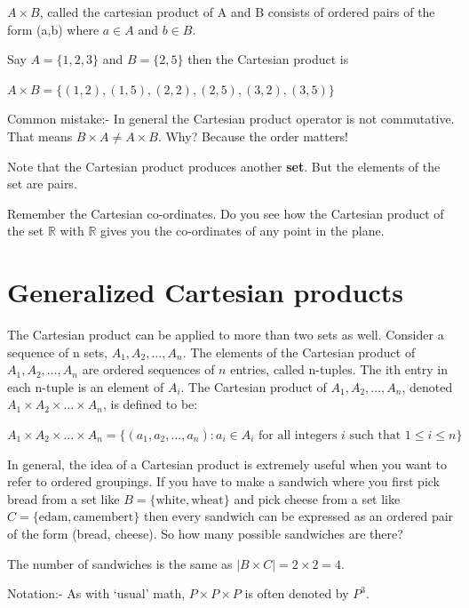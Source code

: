 \documentclass[12pt]{article}
\begin{document}
$A \times B$, called the cartesian product of A and B consists of ordered pairs of the form (a,b) where $a \in A$ and $b \in B$.

Say $A = \{1,2,3\}$ and $B = \{2,5\}$ then the Cartesian product is

$A \times B = \{(1,2), (1,5), (2,2), (2,5), (3,2), (3,5)\}$ 

Common mistake:- In general the Cartesian product operator is not commutative. That means $B \times A \neq A \times B$. Why? Because the order matters!

Note that the Cartesian product produces another {\bf set}. But the elements of the set are pairs. 

Remember the Cartesian co-ordinates. Do you see how the Cartesian product of the set $\mathbb{R}$ with $\mathbb{R}$ gives you the co-ordinates of any point in the plane.

\section*{Generalized Cartesian products}

The Cartesian product can be applied to more than two sets as well. Consider a sequence of n sets, $A_1, A_2, \ldots, A_n$. The elements of the Cartesian product of $A_1, A_2, \ldots, A_n$ are ordered sequences of $n$ entries, called n-tuples. The ith entry in each n-tuple is an element of $A_i$. The Cartesian product of $A_1, A_2, \ldots, A_n$, denoted $A_1 \times A_2 \times \ldots \times A_n$, is defined to be:

$A_1 \times A_2 \times \ldots \times A_n = \{ (a_1, a_2, \ldots , a_n) : a_i \in A_i \text{ for all integers } i \text{ such that } 1 \le i \le n\}$

In general, the idea of a Cartesian product is extremely useful when you want to refer to ordered groupings. If you have to make a sandwich where you first pick bread from a set like $B = \{\text{white},\text{wheat}\}$ and pick cheese from a set like 
$C = \{\text{edam}, \text{camembert}\}$ then every sandwich can be expressed as an ordered pair of the form (bread, cheese). So how many possible sandwiches are there? 

The number of sandwiches is the same as $|B \times C| = 2 \times 2 = 4$.

\vspace{1cm}

Notation:- As with `usual' math, $P \times P \times P$ is often denoted by $P^3$.
\vspace{1cm}
\end{document}
